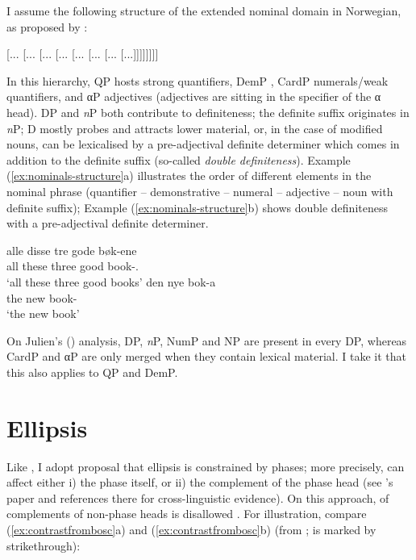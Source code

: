\documentclass[output=paper]{langsci/langscibook}
\begin{document}
I assume the following  structure of the extended nominal domain in
Norwegian, as proposed by \citet{julien2005nominal}:

\ea\label{ex:julien-structure}
    {}[... [... [... [... [...
    [... [... [...]]]]]]]]
\z

\noindent In this hierarchy, QP hosts strong quantifiers, DemP
,
CardP numerals/weak quantifiers, and α{}P adjectives (adjectives are sitting in
the specifier of the α head).  DP and \emph{n}P both contribute to
definiteness; the definite suffix originates in \emph{n}P; D mostly probes
and attracts lower material, or, in the case of modified nouns, can be
lexicalised by a pre-adjectival definite determiner which comes in addition to
the definite suffix (so-called \emph{double definiteness}).  Example
(\ref{ex:nominals-structure}a) illustrates the order of different elements in
the nominal phrase (quantifier -- demonstrative -- numeral -- adjective -- noun
with definite suffix); Example (\ref{ex:nominals-structure}b) shows double
definiteness with a pre-adjectival definite determiner.

\ea\label{ex:nominals-structure} 
    \ea
    \gll alle disse tre gode bøk-ene\\
    	all these three good book-\Pl.\Def{}\\
    	\glt `all these three good books'
    \ex	\gll den nye bok-a \\
    	the new book-\Def{} \\
    	\glt `the new book'
	\z
\z

\noindent  On Julien's (\citeyear[12]{julien2005nominal}) analysis, DP,
\emph{n}P, NumP and NP are present in every DP, whereas CardP and α{}P are only
merged when they contain lexical material. I take it that this also applies to
QP and DemP.

\section{Ellipsis}

Like \citet{simpson2017parallels}, I adopt  proposal that
ellipsis is constrained by phases; more precisely,  can affect either
i) the phase itself, or ii) the complement of the phase head (see
\citeauthor{Boskovic2014}'s paper and references there for cross-linguistic
evidence). On this approach,  of complements of non-phase heads is
disallowed \citep[42]{Boskovic2014}. For illustration, compare
(\ref{ex:contrastfrombosc}a) and  (\ref{ex:contrastfrombosc}b) (from
\citealt[56]{Boskovic2014};  is marked by strikethrough):
\end{document}
